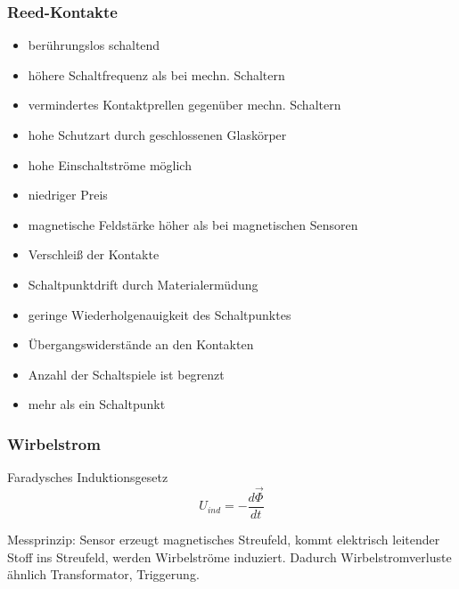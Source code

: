 \documentclass[a4paper]{scrartcl}
\begin{document}
\subsubsection{Reed-Kontakte}
\begin{itemize}
\item berührungslos schaltend
\item höhere Schaltfrequenz als bei mechn. Schaltern
\item vermindertes Kontaktprellen gegenüber mechn. Schaltern
\item hohe Schutzart durch geschlossenen Glaskörper
\item hohe Einschaltströme möglich
\item niedriger Preis
\item magnetische Feldstärke höher als bei magnetischen Sensoren
\item Verschleiß der Kontakte
\item Schaltpunktdrift durch Materialermüdung
\item geringe Wiederholgenauigkeit des Schaltpunktes
\item Übergangswiderstände an den Kontakten
\item Anzahl der Schaltspiele ist begrenzt
\item mehr als ein Schaltpunkt

\end{itemize}

\subsubsection{Wirbelstrom}
Faradysches Induktionsgesetz \[ U_{ind} = - \frac{d \vec{\Phi}}{dt}\]

Messprinzip: Sensor erzeugt magnetisches Streufeld, kommt elektrisch leitender Stoff ins Streufeld, werden Wirbelströme induziert. Dadurch Wirbelstromverluste ähnlich Transformator, Triggerung.
\end{document}
